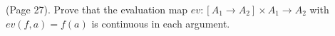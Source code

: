 (Page 27). Prove that the evaluation map $ev:[A_1 \to A_2] \times A_1 \to A_2$ with $ev(f,a) = f(a)$ is continuous in each argument.
